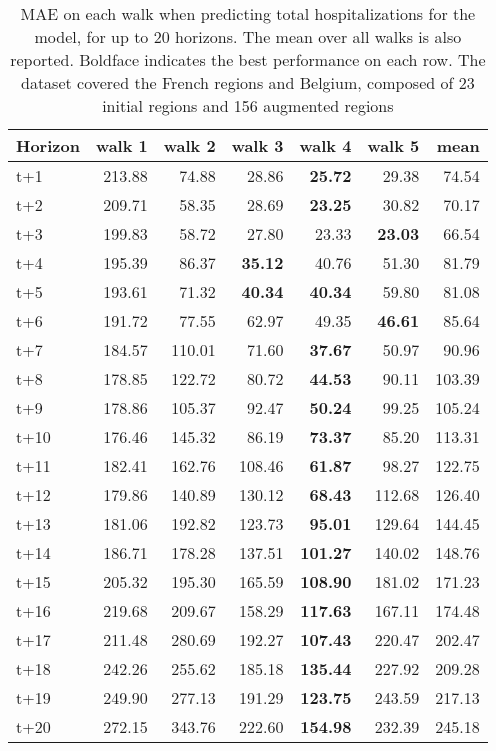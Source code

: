 \begin{table}[H]
\centering
\caption{MAE on each walk when predicting total hospitalizations for the model, for up to 20 horizons. The mean over all walks is also reported. Boldface indicates the best performance on each row. The dataset covered the French regions and Belgium, composed of 23 initial regions and 156 augmented regions }
\label{tab:MAE_walk_dense_model}
\begin{tabular}{lrrrrrr}
\toprule
Horizon &  walk 1 &  walk 2 &  walk 3 &  walk 4 &  walk 5 &   mean \\
\midrule
t+1  & 213.88  & 74.88  & 28.86  & \textbf{25.72}  & 29.38  & 74.54  \\
t+2  & 209.71  & 58.35  & 28.69  & \textbf{23.25}  & 30.82  & 70.17  \\
t+3  & 199.83  & 58.72  & 27.80  & 23.33  & \textbf{23.03}  & 66.54  \\
t+4  & 195.39  & 86.37  & \textbf{35.12}  & 40.76  & 51.30  & 81.79  \\
t+5  & 193.61  & 71.32  & \textbf{40.34}  & \textbf{40.34}  & 59.80  & 81.08  \\
t+6  & 191.72  & 77.55  & 62.97  & 49.35  & \textbf{46.61}  & 85.64  \\
t+7  & 184.57  & 110.01  & 71.60  & \textbf{37.67}  & 50.97  & 90.96  \\
t+8  & 178.85  & 122.72  & 80.72  & \textbf{44.53}  & 90.11  & 103.39  \\
t+9  & 178.86  & 105.37  & 92.47  & \textbf{50.24}  & 99.25  & 105.24  \\
t+10  & 176.46  & 145.32  & 86.19  & \textbf{73.37}  & 85.20  & 113.31  \\
t+11  & 182.41  & 162.76  & 108.46  & \textbf{61.87}  & 98.27  & 122.75  \\
t+12  & 179.86  & 140.89  & 130.12  & \textbf{68.43}  & 112.68  & 126.40  \\
t+13  & 181.06  & 192.82  & 123.73  & \textbf{95.01}  & 129.64  & 144.45  \\
t+14  & 186.71  & 178.28  & 137.51  & \textbf{101.27}  & 140.02  & 148.76  \\
t+15  & 205.32  & 195.30  & 165.59  & \textbf{108.90}  & 181.02  & 171.23  \\
t+16  & 219.68  & 209.67  & 158.29  & \textbf{117.63}  & 167.11  & 174.48  \\
t+17  & 211.48  & 280.69  & 192.27  & \textbf{107.43}  & 220.47  & 202.47  \\
t+18  & 242.26  & 255.62  & 185.18  & \textbf{135.44}  & 227.92  & 209.28  \\
t+19  & 249.90  & 277.13  & 191.29  & \textbf{123.75}  & 243.59  & 217.13  \\
t+20  & 272.15  & 343.76  & 222.60  & \textbf{154.98}  & 232.39  & 245.18  \\

\bottomrule
\end{tabular}
\end{table}
